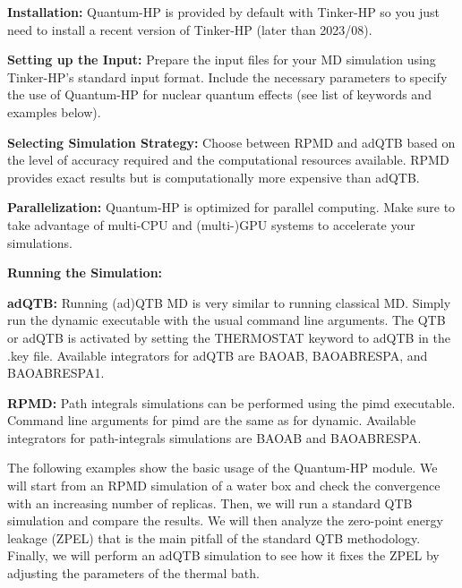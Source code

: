 \begin{DoxyEnumerate}
\item {\bfseries Installation\-:} Quantum-\/\-H\-P is provided by default with Tinker-\/\-H\-P so you just need to install a recent version of Tinker-\/\-H\-P (later than 2023/08).
\item {\bfseries Setting up the Input\-:} Prepare the input files for your M\-D simulation using Tinker-\/\-H\-P's standard input format. Include the necessary parameters to specify the use of Quantum-\/\-H\-P for nuclear quantum effects (see list of keywords and examples below).
\item {\bfseries Selecting Simulation Strategy\-:} Choose between R\-P\-M\-D and ad\-Q\-T\-B based on the level of accuracy required and the computational resources available. R\-P\-M\-D provides exact results but is computationally more expensive than ad\-Q\-T\-B.
\item {\bfseries Parallelization\-:} Quantum-\/\-H\-P is optimized for parallel computing. Make sure to take advantage of multi-\/\-C\-P\-U and (multi-\/)G\-P\-U systems to accelerate your simulations.
\item {\bfseries Running the Simulation\-:}
\begin{DoxyItemize}
\item {\bfseries ad\-Q\-T\-B\-:} Running (ad)Q\-T\-B M\-D is very similar to running classical M\-D. Simply run the {\ttfamily dynamic} executable with the usual command line arguments. The Q\-T\-B or ad\-Q\-T\-B is activated by setting the {\ttfamily T\-H\-E\-R\-M\-O\-S\-T\-A\-T} keyword to {\ttfamily ad\-Q\-T\-B} in the {\ttfamily .key} file. Available integrators for ad\-Q\-T\-B are {\ttfamily B\-A\-O\-A\-B}, {\ttfamily B\-A\-O\-A\-B\-R\-E\-S\-P\-A}, and {\ttfamily B\-A\-O\-A\-B\-R\-E\-S\-P\-A1}.
\item {\bfseries R\-P\-M\-D\-:} Path integrals simulations can be performed using the {\ttfamily pimd} executable. Command line arguments for {\ttfamily pimd} are the same as for {\ttfamily dynamic}. Available integrators for path-\/integrals simulations are {\ttfamily B\-A\-O\-A\-B} and {\ttfamily B\-A\-O\-A\-B\-R\-E\-S\-P\-A}. 


\end{DoxyItemize}
\end{DoxyEnumerate}

The following examples show the basic usage of the Quantum-\/\-H\-P module. We will start from an R\-P\-M\-D simulation of a water box and check the convergence with an increasing number of replicas. Then, we will run a standard Q\-T\-B simulation and compare the results. We will then analyze the zero-\/point energy leakage (Z\-P\-E\-L) that is the main pitfall of the standard Q\-T\-B methodology. Finally, we will perform an ad\-Q\-T\-B simulation to see how it fixes the Z\-P\-E\-L by adjusting the parameters of the thermal bath.

